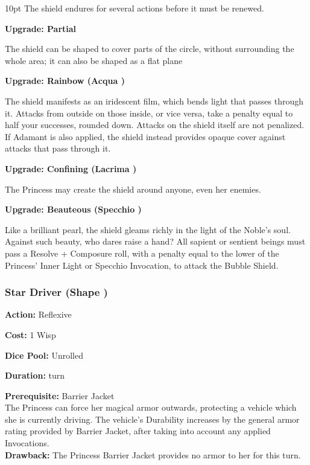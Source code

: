\begin{myindentpar}{10pt}
The shield endures for several actions before it must be renewed.

\textbf{Upgrade: Partial}

The shield can be shaped to cover parts of the circle, without surrounding the whole area; it can also be shaped as a flat plane

\textbf{Upgrade: Rainbow (Acqua \textbullet)}

The shield manifests as an iridescent film, which bends light that passes through it. Attacks from outside on those inside, or vice versa, take a penalty equal to half your successes, rounded down. Attacks on the shield itself are not penalized. If Adamant is also applied, the shield instead provides opaque cover against attacks that pass through it.

\textbf{Upgrade: Confining (Lacrima \textbullet)}

The Princess may create the shield around anyone, even her enemies.

\textbf{Upgrade: Beauteous (Specchio \textbullet)}

Like a brilliant pearl, the shield gleams richly in the light of the Noble's soul. Against such beauty, who dares raise a hand? All sapient or sentient beings must pass a Resolve + Composure roll, with a penalty equal to the lower of the Princess' Inner Light or Specchio Invocation, to attack the Bubble Shield.\end{myindentpar}

\subsubsection*{Star Driver (Shape \textbullet)}

\noindent \textbf{Action:} Reflexive

\noindent \textbf{Cost:} 1 Wisp

\noindent \textbf{Dice Pool:} Unrolled

\noindent \textbf{Duration:} turn 

\noindent \textbf{Prerequisite:} Barrier Jacket \\

\noindent The Princess can force her magical armor outwards, protecting a vehicle which she is currently driving. The vehicle's Durability increases by the general armor rating provided by Barrier Jacket, after taking into account any applied Invocations. \\

\textbf{Drawback:} The Princess Barrier Jacket provides no armor to her for this turn. 

